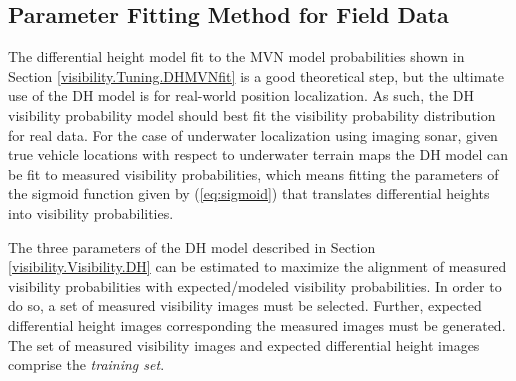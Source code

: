 %

\subsection{Parameter Fitting Method for Field Data}
\label{visibility.Tuning.DHExpFit}

The differential height model fit to the MVN model probabilities shown in Section \ref{visibility.Tuning.DHMVNfit} is a good theoretical step, but the ultimate use of the DH model is for real-world position localization.  As such, the DH visibility probability model should best fit the visibility probability distribution for real data.  For the case of underwater localization using imaging sonar, given true vehicle locations with respect to underwater terrain maps the DH model can be fit to measured visibility probabilities, which means fitting the parameters of the sigmoid function given by (\ref{eq:sigmoid}) that translates differential heights into visibility probabilities.

The three parameters of the DH model described in Section \ref{visibility.Visibility.DH} can be estimated to maximize the alignment of measured visibility probabilities with expected/modeled visibility probabilities.
In order to do so, a set of measured visibility images must be selected.
Further, expected differential height images corresponding the measured images must be generated.
The set of measured visibility images and expected differential height images comprise the \emph{training set}.

